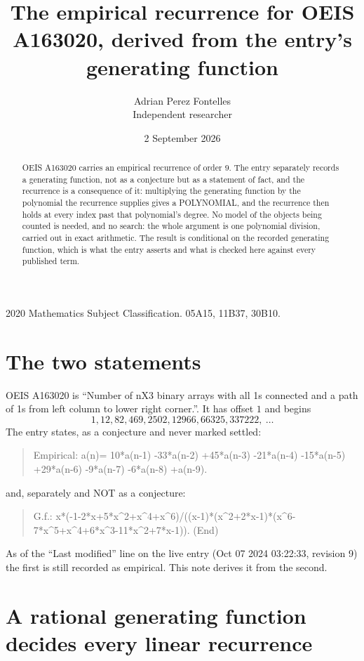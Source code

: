 \documentclass[11pt,a4paper]{article}
\title{The empirical recurrence for OEIS A163020, derived from the entry's generating function}
\author{Adrian Perez Fontelles\\ \small Independent researcher}
\date{2 September 2026}
\theoremstyle{plain}
\theoremstyle{definition}
\begin{document}
\maketitle

\begin{abstract}
OEIS A163020 carries an empirical recurrence of order $9$. The entry separately records a
generating function, not as a conjecture but as a statement of fact, and the recurrence is a
consequence of it: multiplying the generating function by the polynomial the recurrence
supplies gives a POLYNOMIAL, and the recurrence then holds at every index past that
polynomial's degree. No model of the objects being counted is needed, and no search: the
whole argument is one polynomial division, carried out in exact arithmetic. The result is
conditional on the recorded generating function, which is what the entry asserts and what is
checked here against every published term.
\end{abstract}

\noindent\small 2020 Mathematics Subject Classification. 05A15, 11B37, 30B10.\normalsize

\section{The two statements}

OEIS A163020 is ``Number of nX3 binary arrays with all 1s connected and a path of 1s from left column to lower right corner.''. It has offset $1$ and begins
\[
1, 12, 82, 469, 2502, 12966, 66325, 337222,\ \dots
\]
The entry states, as a conjecture and never marked settled:
\begin{quote}
Empirical: a(n)= 10*a(n-1) -33*a(n-2) +45*a(n-3) -21*a(n-4) -15*a(n-5) +29*a(n-6) -9*a(n-7) -6*a(n-8) +a(n-9).
\end{quote}
and, separately and NOT as a conjecture:
\begin{quote}
G.f.: x*(-1-2*x+5*x\^{}2+x\^{}4+x\^{}6)/((x-1)*(x\^{}2+2*x-1)*(x\^{}6-7*x\^{}5+x\^{}4+6*x\^{}3-11*x\^{}2+7*x-1)). (End)
\end{quote}
As of the ``Last modified'' line on the live entry (Oct 07 2024 03:22:33, revision 9) the first is still
recorded as empirical. This note derives it from the second.

\section{A rational generating function decides every linear recurrence}
\end{document}
